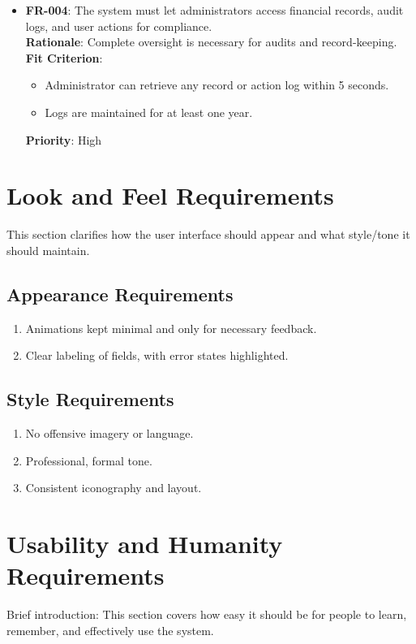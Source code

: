 \documentclass[12pt]{article}
\begin{document}
\begin{itemize}
  \item \textbf{FR-004}: The system must let administrators access financial records, audit logs, and user actions for compliance. \\
  \textbf{Rationale}: Complete oversight is necessary for audits and record-keeping. \\
  \textbf{Fit Criterion}:
    \begin{itemize}
      \item Administrator can retrieve any record or action log within 5 seconds.
      \item Logs are maintained for at least one year.
    \end{itemize}
  \textbf{Priority}: High
\end{itemize}

\section{Look and Feel Requirements}
This section clarifies how the user interface should appear and what style/tone it should maintain.

\subsection{Appearance Requirements}
\begin{enumerate}
  \item Animations kept minimal and only for necessary feedback.
  \item Clear labeling of fields, with error states highlighted.
\end{enumerate}

\subsection{Style Requirements}
\begin{enumerate}
  \item No offensive imagery or language.
  \item Professional, formal tone.
  \item Consistent iconography and layout.
\end{enumerate}

\section{Usability and Humanity Requirements}
Brief introduction: This section covers how easy it should be for people to learn, remember, and effectively use the system.
\end{document}
